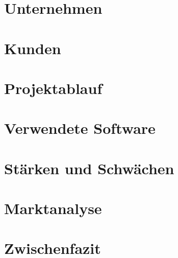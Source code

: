 \section{Unternehmen}


\section{Kunden}


\section{Projektablauf}\label{chap:projektablauf}


\section{Verwendete Software}


\section{Stärken und Schwächen}


\section{Marktanalyse}


\section{Zwischenfazit}


% 
